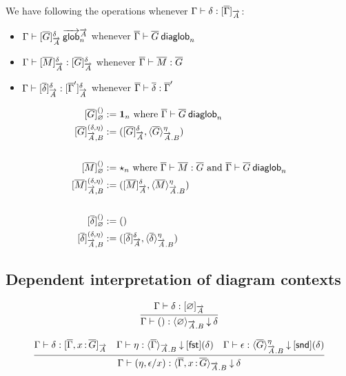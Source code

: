 We have following the operations whenever
${\Gamma} \vdash {\delta} : {[ \overline{\Gamma} ]_{\overrightarrow{A}}}$:

\begin{itemize}
\item ${\Gamma} \vdash {[{\ensuremath{\overline{G}}}]_{\ensuremath{\overrightarrow{A}}}^{\delta}} \: \overrightarrow{\mathsf{glob}}^{\overrightarrow{A}}_{n}$ 
whenever ${\overline{\Gamma}} \vdash {\ensuremath{\overline{G}}} \: \mathsf{diaglob}_{n}$

\item ${\Gamma} \vdash {[{\ensuremath{\overline{M}}}]_{\ensuremath{\overrightarrow{A}}}^{\delta}} : {[{\overline{G}}]_{\overrightarrow{A}}^{\delta}}$
whenever ${\overline{\Gamma}} \vdash {\ensuremath{\overline{M}}} : {\overline{G}}$

\item ${\Gamma} \vdash {[{\ensuremath{\overline{\delta}}}]_{\ensuremath{\overrightarrow{A}}}^{\delta}} : {[{\overline{\Gamma}'}]_{\overrightarrow{A}}^{\delta}}$
whenever ${\overline{\Gamma}} \vdash {\ensuremath{\overline{\delta}}} : {\overline{\Gamma}'}$
\end{itemize}

\[\begin{aligned}
\interpglob{\diag G}{\emptytel}{()} &:=
\unitglob n \text{ where $\wfdiaglob{\diag\Gamma}{\diag G}{n}$} \\
\interpglob{\diag G}{\tel A,B}{(\delta,\eta)} & :=
(\interpglob{\diag G}{\tel A}{\delta},\interpdepglob{\diag G}{\tel A.B}{\eta})\\
&\\
\interpglob{\diag M}{\emptytel}{()} &:=
\unitglobelt n \text{ where $\ofdiaglob{\diag\Gamma}{\diag M}{\diag G}$ and 
$\wfdiaglob{\diag\Gamma}{\diag G}{n}$} \\
\interpglob{\diag M}{\tel A,B}{(\delta,\eta)} & :=
(\interpglob{\diag M}{\tel A}{\delta},\interpdepglob{\diag M}{\tel A.B}{\eta})\\
&\\
\interpglob{\diag\delta}{\emptytel}{()} &:= () \\
\interpglob{\diag\delta}{\tel A,B}{(\delta,\eta)} & :=
(\interpglob{\diag\delta}{\tel A}{\delta},\interpdepglob{\diag\delta}{\tel A.B}{\eta})
\end{aligned}\]

\subsection{Dependent interpretation of diagram contexts}

\[\infer
  {\ofinterpdep{\Gamma}{()}{\emptyctx}{\tel A.B}{\delta}}
  {\ofinterp{\Gamma}{\delta}{\emptyctx}{\tel A}}
\]

\[
\infer
  {\ofinterpdep{\Gamma}{(\eta,\epsilon/x)}
   {\diag\Gamma,\tptm{x}{\diag G}}{\tel A.B}{\delta}}
  {\ofinterp{\Gamma}{\delta}{\diag\Gamma,\tptm{x}{\diag G}}{\tel A}
  &\ofinterpdep{\Gamma}{\eta}{\diag\Gamma}{\tel A.B}{\fstinterp\delta}
  &\ofdepglob{\Gamma}{\epsilon}
   {\interpdepglob{\diag G}{\tel A.B}{\eta}}{\sndinterp\delta}}
\]

